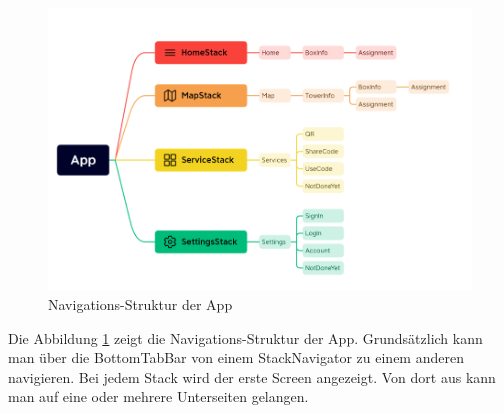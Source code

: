 \begin{figure}[H]
    \centering
    \includegraphics[width=1\textwidth]{images/appnavigation.png}
    \caption{Navigations-Struktur der App}
    \label{fig:appnavigation}
\end{figure}

Die Abbildung \ref{fig:appnavigation} zeigt die Navigations-Struktur der App. Grundsätzlich kann man über die \Gls{BottomTabBar} von einem \Gls{StackNavigator} zu einem anderen navigieren. Bei jedem Stack wird der erste Screen angezeigt. Von dort aus kann man auf eine oder mehrere Unterseiten gelangen.
